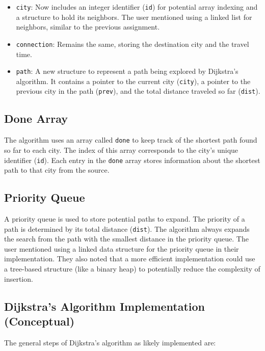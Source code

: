 \documentclass[a4paper,11pt]{article}
\begin{document}
\begin{itemize}
    \item \texttt{city}: Now includes an integer identifier (\texttt{id}) for potential array indexing and a structure to hold its neighbors. The user mentioned using a linked list for neighbors, similar to the previous assignment.
    \item \texttt{connection}: Remains the same, storing the destination city and the travel time.
    \item \texttt{path}: A new structure to represent a path being explored by Dijkstra's algorithm. It contains a pointer to the current city (\texttt{city}), a pointer to the previous city in the path (\texttt{prev}), and the total distance traveled so far (\texttt{dist}).
\end{itemize}

\subsection*{Done Array}
The algorithm uses an array called \texttt{done} to keep track of the shortest path found so far to each city. The index of this array corresponds to the city's unique identifier (\texttt{id}). Each entry in the \texttt{done} array stores information about the shortest path to that city from the source.

\subsection*{Priority Queue}
A priority queue is used to store potential paths to expand. The priority of a path is determined by its total distance (\texttt{dist}). The algorithm always expands the search from the path with the smallest distance in the priority queue. The user mentioned using a linked data structure for the priority queue in their implementation. They also noted that a more efficient implementation could use a tree-based structure (like a binary heap) to potentially reduce the complexity of insertion.

\subsection*{Dijkstra's Algorithm Implementation (Conceptual)}
The general steps of Dijkstra's algorithm as likely implemented are:
\end{document}

